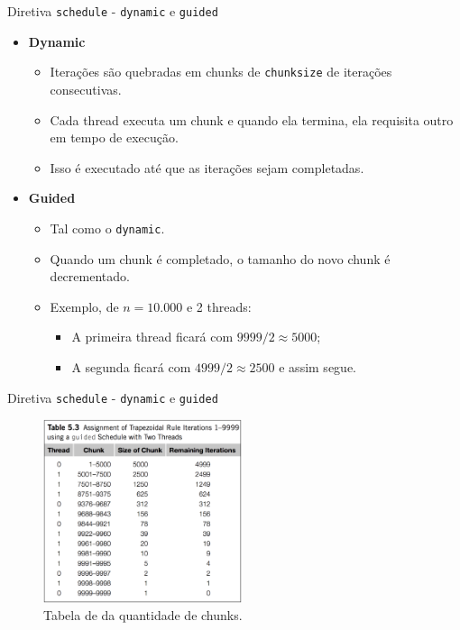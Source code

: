 	
	\begin{frame}{Diretiva {\tt schedule} - {\tt dynamic} e {\tt guided}}
		\begin{itemize}
			\setlength\itemsep{1.2em}
			\item \textbf{Dynamic}
			\begin{itemize}
				\setlength\itemsep{0.7em}
				\item Iterações são quebradas em chunks de {\tt chunksize} de iterações consecutivas.
				\item Cada thread executa um chunk e quando ela termina, ela requisita outro em tempo de execução.
				\item Isso é executado até que as iterações sejam completadas.
			\end{itemize}
			\item \textbf{Guided}
			\begin{itemize}
				\setlength\itemsep{0.5em}
				\item Tal como o {\tt dynamic}.
				\item Quando um chunk é completado, o tamanho do novo chunk é decrementado.
				\item Exemplo, de $n=10.000$ e 2 threads: 
				\begin{itemize}
					\item A primeira thread ficará com $9999/2 \approx 5000$;
					\item A segunda ficará com $4999/2 \approx 2500$ e assim segue.
				\end{itemize}
			\end{itemize}
		\end{itemize}
	\end{frame}

	\begin{frame}{Diretiva {\tt schedule} - {\tt dynamic} e {\tt guided}}
		\begin{figure}[p]
			\centering
			\includegraphics[width=0.52\textwidth]{img/pacheco/dynamic-guided.png}
			\caption{Tabela de da quantidade de chunks.}
		\end{figure}
	\end{frame}

